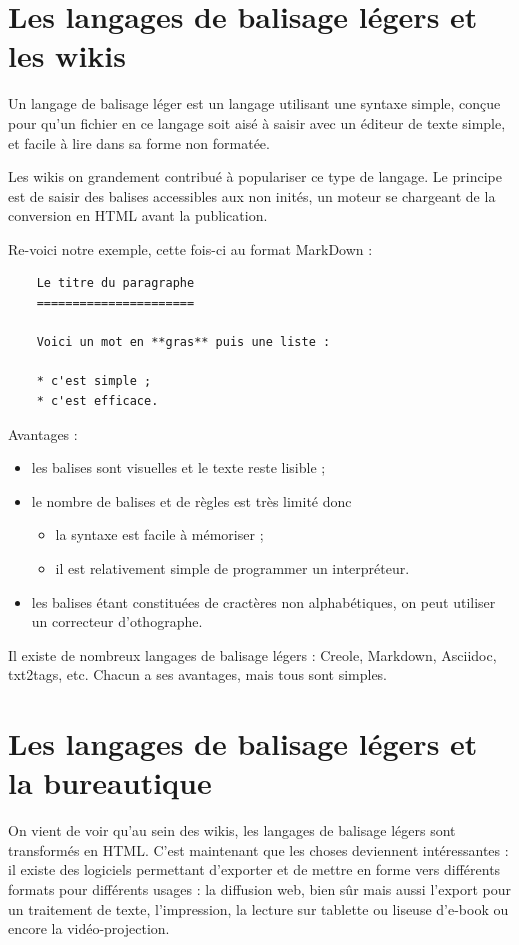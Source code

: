 \documentclass[12pt]{article}
\begin{document}
\section{Les langages de balisage légers et les wikis}

Un langage de balisage léger est un langage utilisant une syntaxe
simple, conçue pour qu'un fichier en ce langage soit aisé à saisir avec
un éditeur de texte simple, et facile à lire dans sa forme non formatée.

Les wikis on grandement contribué à populariser ce type de langage. Le
principe est de saisir des balises accessibles aux non inités, un moteur
se chargeant de la conversion en HTML avant la publication.

Re-voici notre exemple, cette fois-ci au format MarkDown :

\begin{verbatim}
    Le titre du paragraphe
    ======================

    Voici un mot en **gras** puis une liste :

    * c'est simple ;
    * c'est efficace.
\end{verbatim}
Avantages :

\begin{itemize}
\item
  les balises sont visuelles et le texte reste lisible ;
\item
  le nombre de balises et de règles est très limité donc
  \begin{itemize}
  \item
    la syntaxe est facile à mémoriser ;
  \item
    il est relativement simple de programmer un interpréteur.
  \end{itemize}
\item
  les balises étant constituées de cractères non alphabétiques, on peut
  utiliser un correcteur d'othographe.
\end{itemize}
Il existe de nombreux langages de balisage légers : Creole, Markdown,
Asciidoc, txt2tags, etc. Chacun a ses avantages, mais tous sont simples.

\section{Les langages de balisage légers et la bureautique}

On vient de voir qu'au sein des wikis, les langages de balisage légers
sont transformés en HTML. C'est maintenant que les choses deviennent
intéressantes : il existe des logiciels permettant d'exporter et de
mettre en forme vers différents formats pour différents usages : la
diffusion web, bien sûr mais aussi l'export pour un traitement de texte,
l'impression, la lecture sur tablette ou liseuse d'e-book ou encore la
vidéo-projection.
\end{document}
